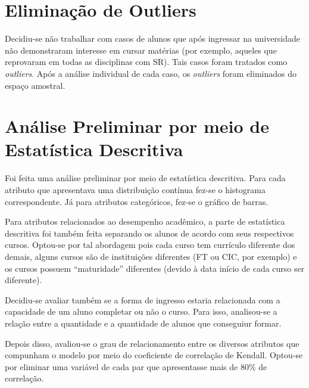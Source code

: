 \section{Eliminação de Outliers}
Decidiu-se não trabalhar com casos de alunos que após ingressar na universidade não
demonstraram interesse em cursar matérias (por exemplo, aqueles que reprovaram em
todas as disciplinas com SR). Tais casos foram tratados como \textit{outliers}.
Após a análise individual de cada caso, os \textit{outliers} foram eliminados do espaço
amostral.

\section{Análise Preliminar por meio de Estatística Descritiva}
Foi feita uma análise preliminar por meio de estatística descritiva. Para cada 
atributo que apresentava uma distribuição contínua fez-se o histograma correspondente.
Já para atributos categóricos, fez-se o gráfico de barras. 
\par Para atributos relacionados ao desempenho acadêmico, a parte de estatística
descritiva foi também feita separando os alunos de acordo com seus respectivos
cursos. Optou-se por tal abordagem pois cada curso tem currículo diferente dos
demais, alguns cursos são de instituições diferentes (FT ou CIC, por exemplo) e os
cursos possuem ``maturidade'' diferentes (devido à data início de cada curso ser
diferente). 

\par Decidiu-se avaliar também se a forma de ingresso estaria relacionada com a
capacidade de um aluno completar ou não o curso. Para isso, analisou-se a relação
entre a quantidade e a quantidade de alunos que conseguiur formar.

\par Depois disso, avaliou-se o grau de relacionamento entre os diversos atributos
que compunham o modelo por meio do coeficiente de correlação de Kendall. Optou-se por
eliminar uma variável de cada par que apresentasse mais de 80\% de correlação.
